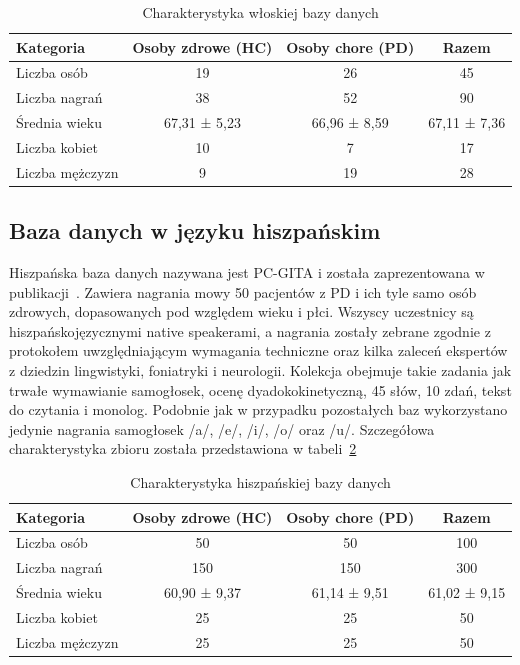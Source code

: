\begin{table}[h]
\centering
\caption{Charakterystyka włoskiej bazy danych}
\label{tab:italian-database}
\begin{tabular}{|l|c|c|c|}
\hline
\textbf{Kategoria} &\textbf{Osoby zdrowe (HC)} &\textbf{Osoby chore (PD)} &\textbf{Razem} \\ \hline
Liczba osób &19 &26 &45\\ \hline
Liczba nagrań &38 &52 &90\\ \hline
Średnia wieku &67,31 ± 5,23 &66,96 ± 8,59  & 67,11 ± 7,36 \\ \hline
Liczba kobiet &10 &7 &17\\ \hline
Liczba mężczyzn &9 &19 &28 \\ \hline
\end{tabular}
\end{table}


\subsection{Baza danych w języku hiszpańskim}
\label{subsec:hiszpanska-baza}


Hiszpańska baza danych nazywana jest PC-GITA i została zaprezentowana w publikacji~\cite{pc-gita}.
Zawiera nagrania mowy 50 pacjentów z PD i ich tyle samo osób zdrowych, dopasowanych pod względem wieku i płci.
Wszyscy uczestnicy są hiszpańskojęzycznymi native speakerami, a nagrania zostały zebrane zgodnie z protokołem uwzględniającym wymagania
techniczne oraz kilka zaleceń ekspertów z dziedzin lingwistyki, foniatryki i neurologii.
Kolekcja obejmuje takie zadania jak trwałe wymawianie samogłosek, ocenę dyadokokinetyczną, 45 słów, 10 zdań, tekst do czytania i monolog.
Podobnie jak w przypadku pozostałych baz wykorzystano jedynie nagrania samogłosek /a/, /e/, /i/, /o/ oraz /u/.
Szczegółowa charakterystyka zbioru została przedstawiona w tabeli~\ref{tab:spanish-database}

\begin{table}[h]
\centering
\caption{Charakterystyka hiszpańskiej bazy danych}
\label{tab:spanish-database}
\begin{tabular}{|l|c|c|c|}
\hline
\textbf{Kategoria} &\textbf{Osoby zdrowe (HC)} &\textbf{Osoby chore (PD)} &\textbf{Razem} \\ \hline
Liczba osób &50 &50 &100\\ \hline
Liczba nagrań &150 &150 &300\\ \hline
Średnia wieku &60,90 ± 9,37 &61,14 ± 9,51  &61,02 ± 9,15\\ \hline
Liczba kobiet &25 &25 &50\\ \hline
Liczba mężczyzn &25 &25 &50 \\ \hline
\end{tabular}
\end{table}

